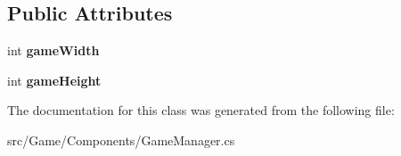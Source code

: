 \subsection*{Public Attributes}
\begin{DoxyCompactItemize}
\item 
\mbox{\label{class_game_1_1_components_1_1_game_manager_aa50485c43a602320a7aaee3e86598d79}} 
int {\bfseries game\+Width}
\item 
\mbox{\label{class_game_1_1_components_1_1_game_manager_a3d0f30ace8ce5fdaee138e3bdb43287c}} 
int {\bfseries game\+Height}
\end{DoxyCompactItemize}


The documentation for this class was generated from the following file\+:\begin{DoxyCompactItemize}
\item 
src/\+Game/\+Components/Game\+Manager.\+cs\end{DoxyCompactItemize}

